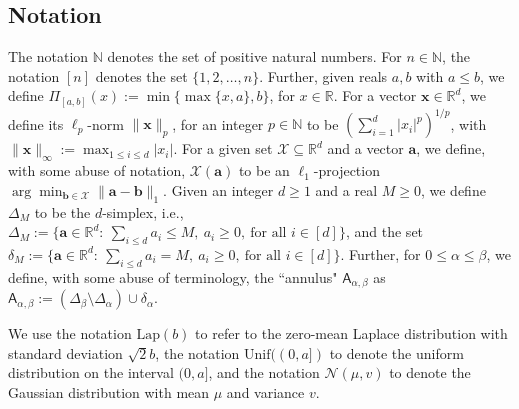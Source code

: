 \documentclass[conference,letterpaper]{IEEEtran}
\theoremstyle{remark}
\theoremstyle{definition}
\begin{document}
\subsection{Notation}
The notation $\mathbb{N}$ denotes the set of positive natural numbers. For $n\in \mathbb{N}$, the notation $[n]$ denotes the set $\{1,2,\ldots,n\}$. 
Further, given reals $a,b$ with $a\leq b$, we define $\Pi_{[a,b]}(x):= \min\{\max\{x,a\},b\}$, for $x\in \mathbb{R}$. For a vector $\mathbf{x}\in \mathbb{R}^d$, we define its $\ell_p$-norm $\lVert \mathbf{x}\rVert_p$, for an integer $p\in \mathbb{N}$ to be $(\sum_{i=1}^d |x_i|^p)^{1/p}$, with $\lVert \mathbf{x}\rVert_\infty:= \max_{1\leq i\leq d} |x_i|$. For a given set $\mathcal{X}\subseteq \mathbb{R}^d$ and a vector $\mathbf{a}$, we define, with some abuse of notation, $\mathcal{X}(\mathbf{a})$ to be an $\ell_1$-projection $\arg \min_{\mathbf{b}\in \mathcal{X}} \lVert \mathbf{a}-\mathbf{b}\rVert_1$. Given an integer $d\geq 1$ and a real $M\geq 0$, we define $\Delta_M$ to be the $d$-simplex, i.e., $\Delta_M:= \{\mathbf{a}\in \mathbb{R}^d:\ \sum_{i\leq d} a_i\leq M,\ a_i\geq 0,\ \text{for all $i\in [d]$}\}$, and the set $\delta_M:= \{\mathbf{a}\in \mathbb{R}^d:\ \sum_{i\leq d} a_i= M,\ a_i\geq 0,\ \text{for all $i\in [d]$}\}$. Further, for $0\leq \alpha\leq \beta$, we define, with some abuse of terminology, the ``annulus" $\mathsf{A}_{\alpha,\beta}$ as $\mathsf{A}_{\alpha,\beta}:= (\Delta_\beta \setminus \Delta_\alpha) \cup \delta_\alpha$. 

We use the notation $\text{Lap}(b)$ to refer to the zero-mean Laplace distribution with standard deviation $\sqrt{2}b$, the notation $\text{Unif}((0,a])$ to denote the uniform distribution on the interval $(0,a]$, and the notation $\mathcal{N}(\mu, v)$ to denote the Gaussian distribution with mean $\mu$ and variance $v$.
\end{document}
